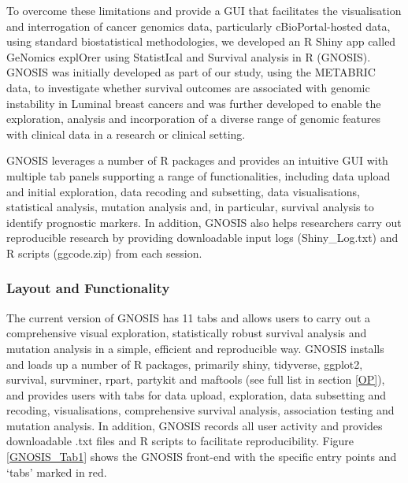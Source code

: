 To overcome these limitations and provide a GUI that facilitates the visualisation and interrogation of cancer genomics data, particularly cBioPortal-hosted data, using standard biostatistical methodologies, we developed an R Shiny app called GeNomics explOrer using StatistIcal and Survival analysis in R (GNOSIS). GNOSIS was initially developed as part of our study, using the METABRIC data, to investigate whether survival outcomes are associated with genomic instability in Luminal breast cancers \citep{King_2021} and was further developed to enable the exploration, analysis and incorporation of a diverse range of genomic features with clinical data in a research or clinical setting. 

GNOSIS leverages a number of R packages and provides an intuitive GUI with multiple tab panels supporting a range of functionalities, including data upload and initial exploration, data recoding and subsetting, data visualisations, statistical analysis, mutation analysis and, in particular, survival analysis to identify prognostic markers. In addition, GNOSIS also helps researchers carry out reproducible research by providing downloadable input logs (Shiny\_Log.txt) and R scripts (ggcode.zip) from each session.  

\subsubsection{Layout and Functionality} 
The current version of GNOSIS has 11 tabs and allows users to carry out a comprehensive visual exploration, statistically robust survival analysis and mutation analysis in a simple, efficient and reproducible way. GNOSIS installs and loads up a number of R packages, primarily shiny, tidyverse, ggplot2, survival, survminer, rpart, partykit and maftools \citep{hothorn_hornik_zeileis_2006, ctree1, ggplot2,  maftools, tidyverse, survminer, rpart, shiny, survival} (see full list in section \ref{OP}), and provides users with tabs for data upload, exploration, data subsetting and recoding, visualisations, comprehensive survival analysis, association testing and mutation analysis. In addition, GNOSIS records all user activity and provides downloadable .txt files and R scripts to facilitate reproducibility. Figure \ref{GNOSIS_Tab1} shows the GNOSIS front-end with the specific entry points and ‘tabs’ marked in red.  

